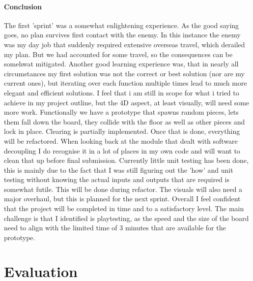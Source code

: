 \documentclass{article}
\begin{document}
\paragraph{Conclusion}
The first 'sprint' was a somewhat enlightening experience. As the good saying goes, no plan survives first contact with the enemy. 
In this instance the enemy was my day job that suddenly required extensive overseas travel, which derailed my plan. But we had accounted for some travel, so the consequences can be somehwat mitigated. 
Another good learning experience was, that in nearly all circumstances my first solution was not the correct or best solution (nor are my current ones), but iterating over each function multiple times lead to much more elegant and efficient solutions. 
I feel that i am still in scope for what i tried to achieve in my project outline, but the 4D aspect, at least visually, will need some more work. 
Functionally we have a prototype that spawns random pieces, lets them fall down the board, they collide with the floor as well as other pieces and lock in place. Clearing is partially implemented. Once that is done, everything will be refactored. When looking back at the module that dealt with software decoupling I do recognise it in a lot of places in my own code and will want to clean that up before final submission.
Currently little unit testing has been done, this is mainly due to the fact that I was still figuring out the 'how' and unit testing without knowing the actual inputs and outputs that are required is somewhat futile. This will be done during refactor.
The visuals will also need a major overhaul, but this is planned for the next sprint.
Overall I feel confident that the project will be completed in time and to a satisfactory level. The main challenge is that I identified is playtesting, as the speed and the size of the board need to align with the limited time of 3 minutes that are available for the prototype.



\section{Evaluation}
\end{document}
